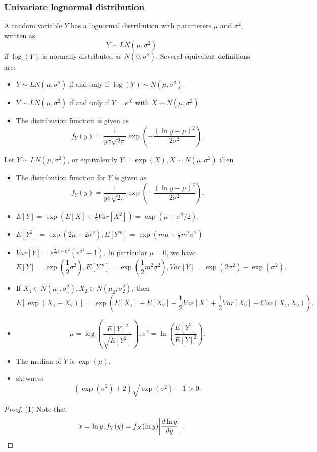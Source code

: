 \begin{refsection}
\subsubsection{Univariate lognormal distribution}
\begin{definition}\label{ch:theory-of-statistics:def:lognormaldistribution}
A random variable $Y$ has a lognormal distribution with parameters $\mu$ and $\sigma^2$, written as
$$Y\sim LN(\mu,\sigma^2)$$
if $\log(Y)$ is normally distributed as $N(0,\sigma^2)$. Several equivalent definitions are:
\begin{itemize}
	\item $Y\sim LN(\mu,\sigma^2)$ if and only if $\log(Y)\sim N(\mu,\sigma^2)$.
	\item $Y\sim LN(\mu,\sigma^2)$ if and only if $Y=e^X$ with $X\sim N(\mu,\sigma^2)$.
	\item The distribution function is given as
	$$f_Y(y) = \frac{1}{y\sigma \sqrt{2\pi}}\exp(-\frac{(\ln y - \mu)^2}{2\sigma^2}).$$
\end{itemize}
\end{definition}

\begin{lemma}\label{ch:theory-of-statistics:th:meanVariancelognormalRandomVariable}
	Let $Y\sim LN(\mu,\sigma^2)$, or equivalently $Y=\exp(X), X\sim N(\mu, \sigma^2)$ then 
	\begin{itemize}
		\item The distribution function for $Y$ is given as
		$$f_Y(y) = \frac{1}{y\sigma \sqrt{2\pi}}\exp(-\frac{(\ln y - \mu)^2}{2\sigma^2}).$$
		\item $E[Y] = \exp(E[X] + \frac{1}{2}Var[X^2]) =\exp(\mu + \sigma^2/2)$.
		\item $E[Y^2] = \exp(2\mu + 2\sigma^2), E[Y^m] = \exp(m\mu + \frac{1}{2}m^2\sigma^2)$
		\item $Var[Y] = e^{2\mu + \sigma^2}(e^{\sigma^2}-1)$.
		In particular $\mu = 0$, we have
		$$E[Y]= \exp(\frac{1}{2}\sigma^2), E[Y^m] = \exp(\frac{1}{2}m^2\sigma^2 ),Var[Y] = \exp(2\sigma^2) - \exp(\sigma^2).$$
		\item If $X_1 \in N(\mu_1,\sigma_1^2), X_2\in N(\mu_2,\sigma_2^2)$, then 
		$$E[\exp(X_1+X_2)] = \exp(E[X_1]+E[X_2] + \frac{1}{2}Var[X] + \frac{1}{2}Var[X_2] + Cov(X_1,X_2)).$$
		\item 
		$$\mu = \log (\frac{E[Y]^2}{\sqrt{E[Y^2]}}),\sigma^2 = \ln (\frac{E[Y^2]}{E[Y]^2}).$$
		\item The median of $Y$ is $\exp(\mu)$.
		\item skewness
		$$(\exp(\sigma^2)+2)\sqrt{\exp(\sigma^2)-1} > 0.$$
	\end{itemize}
\end{lemma}
\begin{proof}
(1) Note that $$x=\ln y, f_Y(y) = f_X(\ln y)\abs{\frac{d\ln y}{dy}}.$$	
	

\end{proof}
\end{refsection}
